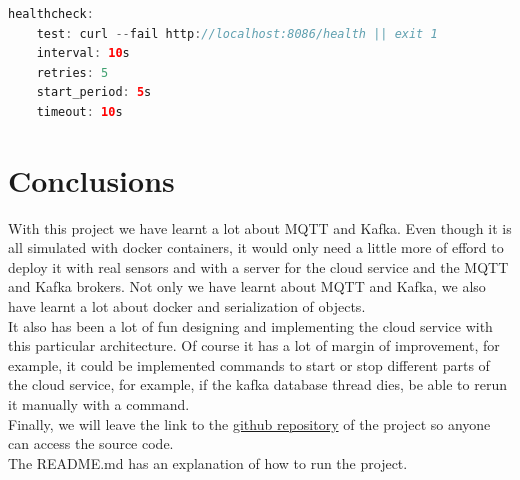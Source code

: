 \documentclass[12pt, letterpaper]{article}
\begin{document}
\begin{lstlisting}[language=java]
healthcheck:
    test: curl --fail http://localhost:8086/health || exit 1
    interval: 10s
    retries: 5
    start_period: 5s
    timeout: 10s
\end{lstlisting}

\section{Conclusions}
With this project we have learnt a lot about MQTT and Kafka. Even though it is all simulated with docker containers, it would only need a little more of efford to deploy it with real sensors and with a server for the cloud service and the MQTT and Kafka brokers. Not only we have learnt about MQTT and Kafka, we also have learnt a lot about docker and serialization of objects. \\

It also has been a lot of fun designing and implementing the cloud service with this particular architecture. Of course it has a lot of margin of improvement, for example, it could be implemented commands to start or stop different parts of the cloud service, for example, if the kafka database thread dies, be able to rerun it manually with a command. \\

Finally, we will leave the link to the \href{https://github.com/RogerFontovaTorres/IoT-Home-Network}{github repository} of the project so anyone can access the source code. \\

The README.md has an explanation of how to run the project.
\end{document}
